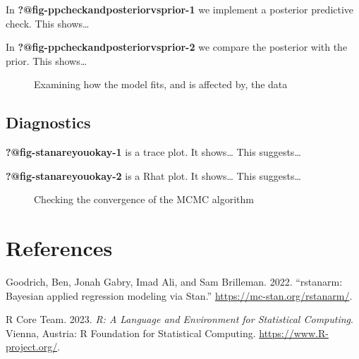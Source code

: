 \documentclass[
  letterpaper,
  DIV=11,
  numbers=noendperiod]{scrartcl}
\newlength{\cslhangindent}
\newenvironment{CSLReferences}[2] %
 {\begin{list}{}{%
  \setlength{\itemindent}{0pt}
  \setlength{\leftmargin}{0pt}
  \setlength{\parsep}{0pt}
  \ifodd #1
   \setlength{\leftmargin}{\cslhangindent}
   \setlength{\itemindent}{-1\cslhangindent}
  \fi
  \setlength{\itemsep}{#2\baselineskip}}}
 {\end{list}}
\begin{document}
In \textbf{?@fig-ppcheckandposteriorvsprior-1} we implement a posterior
predictive check. This shows\ldots{}

In \textbf{?@fig-ppcheckandposteriorvsprior-2} we compare the posterior
with the prior. This shows\ldots{}

\begin{figure}

\begin{minipage}{0.50\linewidth}
Examining how the model fits, and is affected by, the
data\end{minipage}%

\end{figure}%

\subsection{Diagnostics}\label{diagnostics}

\textbf{?@fig-stanareyouokay-1} is a trace plot. It shows\ldots{} This
suggests\ldots{}

\textbf{?@fig-stanareyouokay-2} is a Rhat plot. It shows\ldots{} This
suggests\ldots{}

\begin{figure}

\begin{minipage}{0.50\linewidth}
Checking the convergence of the MCMC algorithm\end{minipage}%

\end{figure}%

\newpage

\section*{References}\label{references}

\label{refs}
\begin{CSLReferences}{1}{0}
Goodrich, Ben, Jonah Gabry, Imad Ali, and Sam Brilleman. 2022.
{``{rstanarm: {Bayesian} applied regression modeling via {Stan}}.''}
\url{https://mc-stan.org/rstanarm/}.

R Core Team. 2023. \emph{{R: A Language and Environment for Statistical
Computing}}. Vienna, Austria: R Foundation for Statistical Computing.
\url{https://www.R-project.org/}.

\end{CSLReferences}
\end{document}
